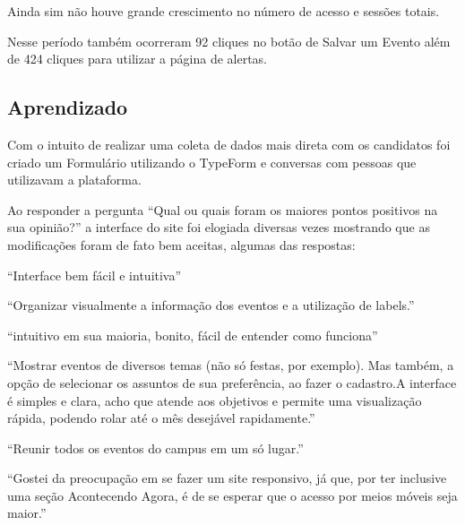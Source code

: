 \par Ainda sim não houve grande crescimento no número de acesso e sessões totais.

\par Nesse período também ocorreram 92 cliques no botão de Salvar um Evento além de 424 cliques para utilizar a página de alertas.
\subsection{Aprendizado}
\par Com o intuito de realizar uma coleta de dados mais direta com os candidatos foi criado um Formulário utilizando o TypeForm e conversas com pessoas que utilizavam a plataforma.
\par Ao responder a pergunta ``Qual ou quais foram os maiores pontos positivos na sua opinião?'' a interface do site foi elogiada diversas vezes mostrando que as modificações foram de fato bem aceitas, algumas das respostas:
\par ``Interface bem fácil e intuitiva''\\
\par ``Organizar visualmente a informação dos eventos e a utilização de labels.''\\
\par ``intuitivo em sua maioria, bonito, fácil de entender como funciona''\\
\par ``Mostrar eventos de diversos temas (não só festas, por exemplo). Mas também, a
opção de selecionar os assuntos de sua preferência, ao fazer o cadastro.A interface é simples e clara, acho que atende aos objetivos e permite uma visualização rápida, podendo rolar até o mês desejável rapidamente.''\\
\par ``Reunir todos os eventos do campus em um só lugar.''\\
\par ``Gostei da preocupação em se fazer um site responsivo, já que, por ter inclusive uma seção Acontecendo Agora, é de se esperar que o acesso por meios móveis seja maior.''\\

